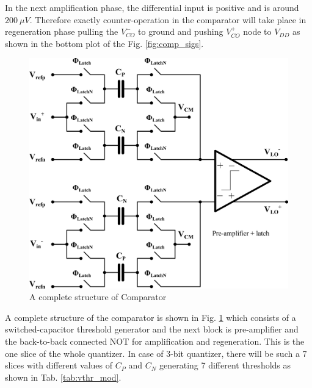 In the next amplification phase, the differential input is positive and is around $200~\mu V$. Therefore exactly counter-operation in the comparator will take place in regeneration phase pulling the $V_{CO}^-$ to ground and pushing $V_{CO}^+$ node to $V_{DD}$ as shown in the bottom plot of the Fig. \ref{fig:comp_sigs}.
\begin{figure}[h]
\centering
\includegraphics[width=0.75\columnwidth]{Chap05/Figures/comp_thr.png}
\caption{A complete structure of Comparator}
\label{COMP_THR}
\end{figure}

A complete structure of the comparator is shown in Fig. \ref{COMP_THR} which consists of a switched-capacitor threshold generator and the next block is pre-amplifier and the back-to-back connected NOT for amplification and regeneration. This is the one slice of the whole quantizer. In case of 3-bit quantizer, there will be such a 7 slices with different values of $C_P$ and $C_N$ generating 7 different thresholds as shown in Tab. \ref{tab:vthr_mod}.
